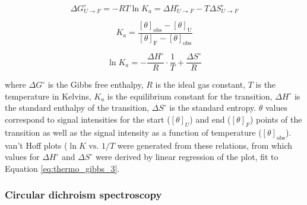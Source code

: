 \begin{refsection}
\begin{equation}
    \label{eq:thermo_gibbs_1}
    \Delta G^{\circ}_{U \rightarrow F}=-RT\ln K_{a}=
    \Delta H^{\circ}_{U \rightarrow F}-
    T \Delta S^{\circ}_{U \rightarrow F}
\end{equation}

\begin{equation}
    \label{eq:thermo_gibbs_2}
    K_{a}=\frac
    {[\theta]_{\text{obs}}-[\theta]_{\text{U}}}
    {[\theta]_{\text{F}}-[\theta]_{\text{obs}}}
\end{equation}

\begin{equation}
    \label{eq:thermo_gibbs_3}
    \ln K_{a}=-\frac{\Delta H^{\circ}}{R}\cdot\frac{1}{T}+\frac{\Delta S^{\circ}}{R}
\end{equation}

where ${\Delta G^{\circ}}$ is the Gibbs free enthalpy, ${R}$ is the ideal gas constant,
${T}$ is the temperature in Kelvins, ${K_{a}}$ is the equilibrium constant for
the transition, ${\Delta H^{\circ}}$ is the standard enthalpy of the transition,
${\Delta S^{\circ}}$ is the standard entropy. ${\theta}$ values correspond to signal
intensities for the start (${[\theta]_{U}}$) and end (${[\theta]_{F}}$) points
of the transition as well as the signal intensity as a function of temperature
(${[\theta]_{\text{obs}}}$).
van't Hoff plots (${\ln K \text{ vs. } 1/T}$ were generated from these
relations, from which values for ${\Delta H^{\circ}}$ and ${\Delta S^{\circ}}$ were derived by
linear regression of the plot, fit to Equation \ref{eq:thermo_gibbs_3}.

\subsubsection{Circular dichroism spectroscopy}


\end{refsection}
